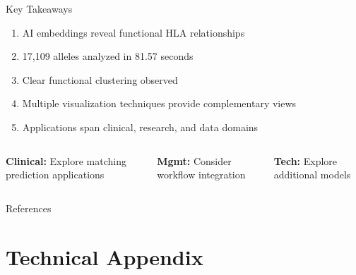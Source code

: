 \documentclass[aspectratio=169]{beamer}
\newcommand{\formanagement}[1]{\textcolor{managementcolor}{\textbf{Mgmt:} #1}}
\newcommand{\forclinical}[1]{\textcolor{clinicalcolor}{\textbf{Clinical:} #1}}
\newcommand{\forbioinformatics}[1]{\textcolor{bioinfocolor}{\textbf{Tech:} #1}}
\begin{document}
\begin{frame}{Key Takeaways}
  \begin{tcolorbox}[colback=white,colframe=hlablue!75!black]
  \begin{enumerate}\small
    \item AI embeddings reveal functional HLA relationships
    \item 17,109 alleles analyzed in 81.57 seconds
    \item Clear functional clustering observed
    \item Multiple visualization techniques provide complementary views
    \item Applications span clinical, research, and data domains
  \end{enumerate}
  \end{tcolorbox}
  
  \begin{columns}
    \begin{column}{0.33\textwidth}
      \begin{tcolorbox}[colback=gray!5,colframe=gray!40]\small
      \forclinical{Explore matching prediction applications}
      \end{tcolorbox}
    \end{column}
    \begin{column}{0.33\textwidth}
      \begin{tcolorbox}[colback=gray!5,colframe=gray!40]\small
      \formanagement{Consider workflow integration}
      \end{tcolorbox}
    \end{column}
    \begin{column}{0.33\textwidth}
      \begin{tcolorbox}[colback=gray!5,colframe=gray!40]\small
      \forbioinformatics{Explore additional models}
      \end{tcolorbox}
    \end{column}
  \end{columns}
\end{frame}

\begin{frame}[allowframebreaks]{References}
  
\end{frame}

\appendix
\section{Technical Appendix}
\end{document}
